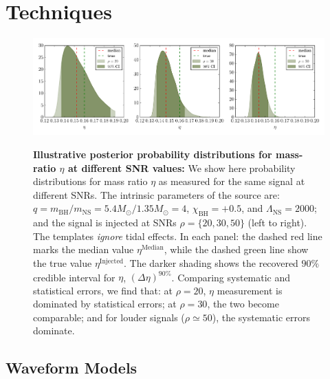\documentclass[aps,prd,amsmath,floats,floatfix, twocolumn,
superscriptaddress,nofootinbib,showpacs]{revtex4-1}
\newcommand{\lambdans}{\Lambda_\mathrm{NS}}
\newcommand{\chibh}{\chi_\mathrm{BH}}
\newcommand{\mbh}{m_\mathrm{BH}}
\newcommand{\mns}{m_\mathrm{NS}}
\begin{document}
\section{Techniques}\label{s1:techniques}
\begin{figure}
\centering 
\includegraphics[trim=20 18 18 18 0,clip=true,width=1.8\columnwidth]{SingleSystemEta_q4_0_mc2_25_chi0_50}\\
\caption{{\bf Illustrative posterior probability distributions for mass-ratio $\eta$ at different SNR values:}
We show here probability distributions for mass ratio $\eta$ as measured
for the same signal at different SNRs. The intrinsic parameters of the source
are: $q = \mbh/\mns = 5.4M_\odot/1.35M_\odot = 4$, $\chibh=+0.5$, and $\lambdans=2000$;
and the signal is injected at SNRs $\rho=\{20,30,50\}$ (left to right). The templates
{\it ignore} tidal effects.
% 
In each panel: the dashed red line marks the median value
$\eta^\mathrm{Median}$, while the dashed green line show the true value
$\eta^\mathrm{Injected}$. The darker shading shows
the recovered $90\%$ credible interval for $\eta$, $(\Delta\eta)^{90\%}$.
% 
Comparing systematic and statistical errors, we find that:
at $\rho=20$, $\eta$ measurement is dominated by statistical
errors; at $\rho=30$, the two become comparable; and 
for louder signals ($\rho\simeq50$), the systematic errors dominate.
}
\label{fig:SingleSystemEtaPDFvsSNR}
\end{figure}
% 


\subsection{Waveform Models}\label{s2:waveforms}
\end{document}
